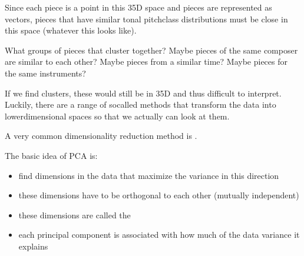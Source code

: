 \documentclass[letterpaper,10pt,english]{sphinxmanual}
\begin{document}
\sphinxAtStartPar
Since each piece is a point in this 35\sphinxhyphen{}D space and pieces are represented as vectors, pieces that have similar tonal pitch\sphinxhyphen{}class distributions must be close in this space (whatever this looks like).

\sphinxAtStartPar
What groups of pieces that cluster together? Maybe pieces of the same composer are similar to each other? Maybe pieces from a similar time? Maybe pieces for the same instruments?

\sphinxAtStartPar
If we find clusters, these would still be in 35\sphinxhyphen{}D and thus difficult to interpret. Luckily, there are a range of so\sphinxhyphen{}called  methods that transform the data into lower\sphinxhyphen{}dimensional spaces so that we actually can look at them.

\sphinxAtStartPar
A very common dimensionality reduction method is .

\sphinxAtStartPar
The basic idea of PCA is:
\begin{itemize}
\item {} 
\sphinxAtStartPar
find dimensions in the data that maximize the variance in this direction

\item {} 
\sphinxAtStartPar
these dimensions have to be orthogonal to each other (mutually independent)

\item {} 
\sphinxAtStartPar
these dimensions are called the 

\item {} 
\sphinxAtStartPar
each principal component is associated with how much of the data variance it explains

\end{itemize}
\end{document}
